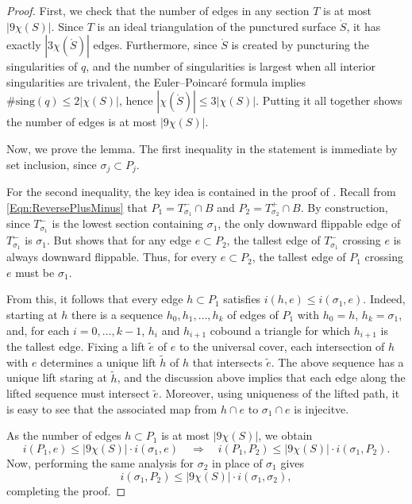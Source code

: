 \documentclass[11pt,letterpaper]{amsart}
\newcommand{\sing}{\mathrm{sing}}
\newcommand{\wt}{\widetilde}
\newcommand{\mr}{\mathring}
\numberwithin{equation}{section}
\theoremstyle{definition}
\begin{document}
\begin{proof}
First, we check that the number of edges in any section $T$ is at most $|9 \chi(S)|$. Since $T$ is an ideal triangulation of the punctured surface $\mr S$, it has exactly $ |3 \chi(\mr S)|$ edges. Furthermore, since $\mr S$ is created by puncturing the singularities of $q$, and the number of singularities is largest when all interior singularities are trivalent, the Euler--Poincar\'e formula implies 
$\# \sing(q) \leq 2 |\chi(S)|$, hence
$|\chi(\mr S)| \leq 3 |\chi(S)|$. Putting it all together shows the number of edges is at most $|9 \chi(S)|$. 

Now, we prove the lemma. The first inequality in the statement is immediate by set inclusion, since $\sigma_j \subset P_j$.

For the second inequality, the key idea is contained in the proof of \cite[Lemma 3.4]{MinskyTaylor:FiberedFaces}. 
Recall from 
\eqref{Eqn:ReversePlusMinus} that $P_1 = T^-_{\sigma_1} \cap B$  and $P_2 =  T^+_{\sigma_2} \cap B$.
By construction, since $T^-_{\sigma_1}$ is the lowest section containing $\sigma_1$, the only  downward flippable edge of $T^-_{\sigma_1}$ is $\sigma_1$.  But \cite[Lemma 3.4]{MinskyTaylor:FiberedFaces} shows that for any edge $e \subset P_2$, the tallest edge of $T^-_{\sigma_1}$ crossing $e$ is always downward flippable. Thus, for every $e \subset P_2$, the tallest edge of $P_1$ crossing $e$ must be $\sigma_1$. 

From this, it follows that every edge $h \subset P_1$ satisfies $i(h,e) \le i(\sigma_1,e)$. Indeed, starting at $h$ there is a sequence $h_0, h_1, \ldots, h_k$ of edges of $P_1$ with $h_0=h$, $h_k = \sigma_1$, and, for each $i =0 ,\ldots, k-1$, $h_i$ and $h_{i+1}$ cobound a triangle for which $h_{i+1}$ is the tallest edge. 
Fixing a lift $\wt e$ of $e$ to the universal cover, each intersection of $h$ with $e$ determines a unique lift $\wt h$ of $h$ that intersects $\wt e$. The above sequence has a unique lift staring at $\wt h$, and the discussion above implies that each edge along the lifted sequence must intersect $\wt e$. Moreover, using uniqueness of the lifted path, it is easy to see that the associated map from $h \cap e$ to $\sigma_1 \cap e$ is injecitve.


As the number of edges  $h \subset P_1$ is at most $|9 \chi(S)|$,
 we obtain 
\[
i(P_1,e) \leq |9 \chi(S)| \cdot i(\sigma_1,e)
\quad \Rightarrow \quad
i(P_1, P_2) \leq |9 \chi(S)| \cdot i(\sigma_1, P_2).
\]
Now, performing the same analysis for $\sigma_2$ in place of $\sigma_1$ gives
\[
i(\sigma_1, P_2) \leq |9 \chi(S)| \cdot i(\sigma_1, \sigma_2),
\]
completing the proof.
\end{proof}
\end{document}
